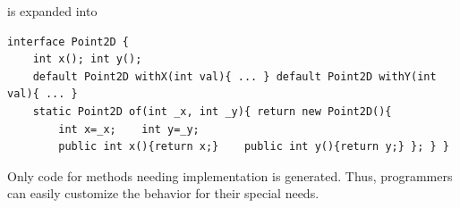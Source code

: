 \noindent is expanded into
\begin{lstlisting}
interface Point2D { 
    int x(); int y();
    default Point2D withX(int val){ ... } default Point2D withY(int val){ ... }
    static Point2D of(int _x, int _y){ return new Point2D(){
        int x=_x;    int y=_y;
        public int x(){return x;}    public int y(){return y;} }; } }
\end{lstlisting}

\noindent Only code for methods needing implementation is generated. Thus,
programmers can easily customize the behavior for their special needs.





%

